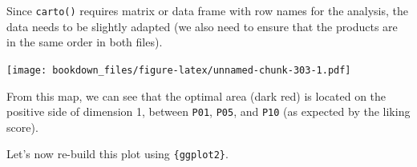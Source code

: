 \documentclass[
]{krantz}
\makeatletter
\newenvironment{Shaded}{\begin{snugshade}}{\end{snugshade}}
\newcommand{\AttributeTok}[1]{\textcolor[rgb]{0.61,0.61,0.61}{#1}}
\newcommand{\ConstantTok}[1]{\textcolor[rgb]{0,0,0}{#1}}
\newcommand{\DecValTok}[1]{\textcolor[rgb]{0.06,0.06,0.06}{#1}}
\newcommand{\FunctionTok}[1]{\textcolor[rgb]{0,0,0}{#1}}
\newcommand{\NormalTok}[1]{#1}
\newcommand{\OtherTok}[1]{\textcolor[rgb]{0.37,0.37,0.37}{#1}}
\newcommand{\SpecialCharTok}[1]{\textcolor[rgb]{0,0,0}{#1}}
\newcommand{\StringTok}[1]{\textcolor[rgb]{0.5,0.5,0.5}{#1}}
\newenvironment{kframe}{%
\medskip{}
\setlength{\fboxsep}{.8em}
 \def\at@end@of@kframe{}%
 \ifinner\ifhmode%
  \def\at@end@of@kframe{\end{minipage}}%
  \begin{minipage}{\columnwidth}%
 \fi\fi%
 \def\FrameCommand##1{\hskip\@totalleftmargin \hskip-\fboxsep
 \colorbox{shadecolor}{##1}\hskip-\fboxsep
     \hskip-\linewidth \hskip-\@totalleftmargin \hskip\columnwidth}%
 \MakeFramed {\advance\hsize-\width
   \@totalleftmargin\z@ \linewidth\hsize
   \@setminipage}}%
 {\par\unskip\endMakeFramed%
 \at@end@of@kframe}
\renewenvironment{Shaded}{\begin{kframe}}{\end{kframe}}
\makeatother
\begin{document}
Since \texttt{carto()} requires matrix or data frame with row names for the analysis, the data needs to be slightly adapted (we also need to ensure that the products are in the same order in both files).

\begin{Shaded}
\end{Shaded}

\texttt{[image: bookdown\_files/figure-latex/unnamed-chunk-303-1.pdf]}

From this map, we can see that the optimal area (dark red) is located on the positive side of dimension 1, between \texttt{P01}, \texttt{P05}, and \texttt{P10} (as expected by the liking score).

Let's now re-build this plot using \texttt{\{ggplot2\}}.
\end{document}
